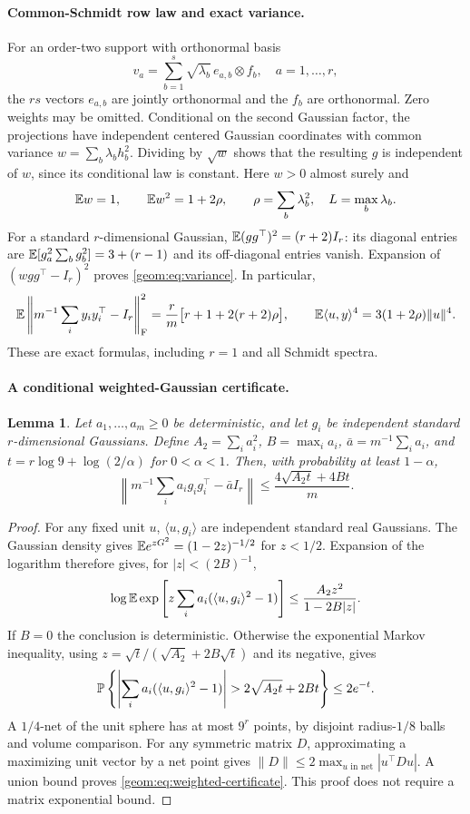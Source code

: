\documentclass[11pt,a4paper]{article}
\newtheorem{lemma}[theorem]{Lemma}
\theoremstyle{definition}\newtheorem{definition}[theorem]{Definition}
\theoremstyle{remark}\newtheorem{remark}[theorem]{Remark}
\numberwithin{equation}{section}
\newcommand{\Id}{I}\newcommand{\F}{\mathrm F}
\newcommand{\norm}[1]{\lVert#1\rVert}\newcommand{\ip}[2]{\langle#1,#2\rangle}
\begin{document}
\paragraph{Common-Schmidt row law and exact variance.}
For an order-two support with orthonormal basis
\[
 v_a=\sum_{b=1}^s\sqrt{\lambda_b}\,e_{a,b}\otimes f_b,
 \quad a=1,\ldots,r,
\]
the $rs$ vectors $e_{a,b}$ are jointly orthonormal and the $f_b$ are
orthonormal. Zero weights may be omitted. Conditional on the second
Gaussian factor, the projections have independent centered Gaussian
coordinates with common variance $w=\sum_b\lambda_bh_b^2$. Dividing by
$\sqrt w$ shows that the resulting $g$ is independent of $w$, since its
conditional law is constant. Here $w>0$ almost surely and
\[
 \mathbb E w=1,\qquad \mathbb E w^2=1+2\rho,
 \qquad \rho=\sum_b\lambda_b^2,\quad L=\max_b\lambda_b.
\]
For a standard $r$-dimensional Gaussian,
$\E(gg^\top)^2=(r+2)\Id_r$: its diagonal entries are
$\mathbb E[g_a^2\sum_bg_b^2]=3+(r-1)$ and its off-diagonal entries vanish.
Expansion of $(wgg^\top-\Id_r)^2$ proves
\eqref{geom:eq:variance}. In particular,
\begin{equation}\label{geom:eq:frob-variance}
 \E\left\|m^{-1}\sum_i y_iy_i^\top-\Id_r\right\|_\F^2
 =\frac r m\bigl[r+1+2(r+2)\rho\bigr],
 \qquad \E\ip uy^4=3(1+2\rho)\norm u^4.
\end{equation}
These are exact formulas, including $r=1$ and all Schmidt spectra.

\paragraph{A conditional weighted-Gaussian certificate.}
\begin{lemma}\label{geom:lem:weighted-gaussian}
Let $a_1,\ldots,a_m\ge0$ be deterministic, and let $g_i$ be independent
standard $r$-dimensional Gaussians. Define
$A_2=\sum_i a_i^2$, $B=\max_i a_i$, $\bar a=m^{-1}\sum_i a_i$, and
$t=r\log9+\log(2/\alpha)$ for $0<\alpha<1$. Then, with probability at
least $1-\alpha$,
\begin{equation}\label{geom:eq:weighted-certificate}
 \left\|m^{-1}\sum_i a_ig_ig_i^\top-\bar a\Id_r\right\|
 \le\frac{4\sqrt{A_2t}+4Bt}{m}.
\end{equation}
\end{lemma}
\begin{proof}
For any fixed unit $u$, $\ip u{g_i}$ are independent standard real
Gaussians. The Gaussian density gives
$\mathbb E e^{zG^2}=(1-2z)^{-1/2}$ for $z<1/2$. Expansion of the logarithm
therefore gives, for $|z|<(2B)^{-1}$,
\[
 \log\E\exp\left[z\sum_i a_i(\ip u{g_i}^2-1)\right]
 \le\frac{A_2z^2}{1-2B|z|}.
\]
If $B=0$ the conclusion is deterministic. Otherwise the exponential
Markov inequality, using
$z=\sqrt t/(\sqrt{A_2}+2B\sqrt t)$ and its negative, gives
\[
 \Pp\left\{\left|\sum_i a_i(\ip u{g_i}^2-1)\right|
 >2\sqrt{A_2t}+2Bt\right\}\le2e^{-t}.
\]
A $1/4$-net of the unit sphere has at most $9^r$ points, by disjoint
radius-$1/8$ balls and volume comparison. For any symmetric matrix $D$,
approximating a maximizing unit vector by a net point gives
$\norm D\le2\max_{u\text{ in net}}|u^\top Du|$. A union bound proves
\eqref{geom:eq:weighted-certificate}. This proof does not require a
matrix exponential bound.
\end{proof}
\end{document}
